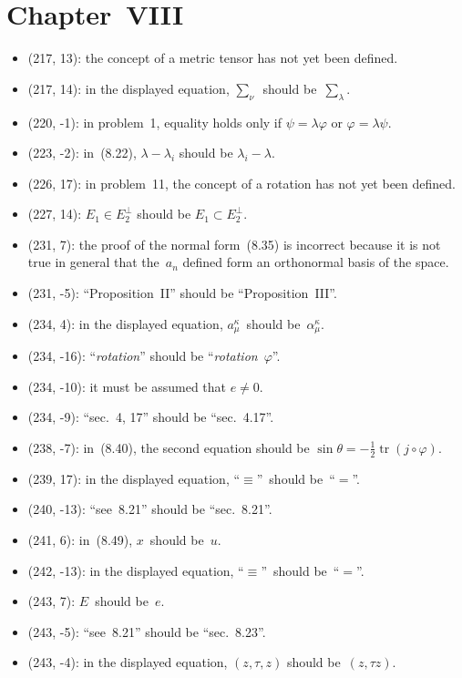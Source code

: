 \documentclass[letterpaper,12pt]{article}
\DeclareMathOperator{\tr}{tr}
\newcommand{\after}{\circ}
\newcommand{\iprod}[2]{(#1,#2)}
\newcommand{\oc}[1]{#1^{\perp}}
\begin{document}
\section*{Chapter~VIII}
\begin{itemize}
\item (217, 13): the concept of a metric tensor has not yet been defined.
\item (217, 14): in the displayed equation, \(\displaystyle\sum_{\nu}\)~should be~\(\displaystyle\sum_{\lambda}\).
\item (220, -1): in problem~1, equality holds only if \(\psi=\lambda\varphi\) or \(\varphi=\lambda\psi\).
\item (223, -2): in~(8.22), \(\lambda-\lambda_i\) should be \(\lambda_i-\lambda\).
\item (226, 17): in problem~11, the concept of a rotation has not yet been defined.
\item (227, 14): \(E_1\in\oc{E_2}\) should be \(E_1\subset\oc{E_2}\).
\item (231, 7): the proof of the normal form~(8.35) is incorrect because it is not true in general that the~\(a_n\) defined form an orthonormal basis of the space.
\item (231, -5): ``Proposition~II'' should be ``Proposition~III''.
\item (234, 4): in the displayed equation, \(a^{\kappa}_{\mu}\)~should be~\(\alpha^{\kappa}_{\mu}\).
\item (234, -16): ``\emph{rotation}'' should be ``\emph{rotation}~\(\varphi\)''.
\item (234, -10): it must be assumed that \(e\ne 0\).
\item (234, -9): ``sec.~4, 17'' should be ``sec.~4.17''.
\item (238, -7): in~(8.40), the second equation should be \(\sin\theta=-\tfrac{1}{2}\tr(j\after\varphi)\).
\item (239, 17): in the displayed equation, ``\(\equiv\)''~should be~``\(=\)''.
\item (240, -13): ``see~8.21'' should be ``sec.~8.21''.
\item (241, 6): in~(8.49), \(x\)~should be~\(u\).
\item (242, -13): in the displayed equation, ``\(\equiv\)''~should be~``\(=\)''.
\item (243, 7): \(E\)~should be~\(e\).
\item (243, -5): ``see~8.21'' should be ``sec.~8.23''.
\item (243, -4): in the displayed equation, \((z,\tau,z)\) should be~\(\iprod{z}{\tau z}\).

\end{itemize}
\end{document}
